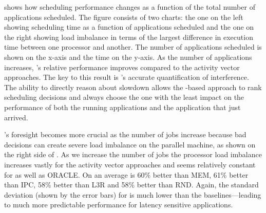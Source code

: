  shows how scheduling performance
changes as a function of the total number of applications scheduled.
The figure consists of two charts: the one on the left showing
scheduling time as a function of applications scheduled and the one on
the right showing load imbalance in terms of the largest difference in
execution time between one processor and another. The number of
applications scheduled is shown on the x-axis and the time on the
y-axis.  As the number of applications increases, \SYSTEM{}'s relative
performance improves compared to the activity vector approaches. The
key to this result is \SYSTEM{}'s accurate quantification of
interference.  The ability to directly reason about slowdown allows
the \SYSTEM{}-based approach to rank scheduling decisions and always
choose the one with the least impact on the performance of both the
running applications and the application that just arrived.

\SYSTEM{}'s foresight becomes more crucial as the number of jobs
increase because bad decisions can create severe load imbalance on the
parallel machine, as shown on the right side of
. As we increase the number of jobs
the processor load imbalance increases vastly for the activity vector
approaches and seems relatively constant for \SYSTEM{} as well as
ORACLE. On an average \SYSTEM{} is 60\% better than MEM, 61\% better
than IPC, 58\% better than L3R and 58\% better than RND. Again, the
standard deviation (shown by the error bars) for \SYSTEM{} is much
lower than the baselines---leading to much more predictable
performance for latency sensitive applications.


